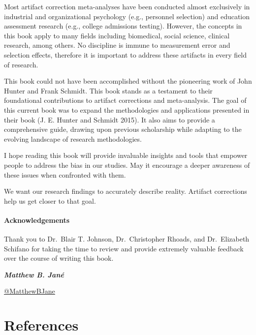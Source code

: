 \documentclass[
  letterpaper,
  DIV=11,
  numbers=noendperiod]{scrreprt}
\begin{document}
Most artifact correction meta-analyses have been conducted almost
exclusively in industrial and organizational psychology (e.g., personnel
selection) and education assessment research (e.g., college admissions
testing). However, the concepts in this book apply to many fields
including biomedical, social science, clinical research, among others.
No discipline is immune to measurement error and selection effects,
therefore it is important to address these artifacts in every field of
research.

This book could not have been accomplished without the pioneering work
of John Hunter and Frank Schmidt. This book stands as a testament to
their foundational contributions to artifact corrections and
meta-analysis. The goal of this current book was to expand the
methodologies and applications presented in their book (J. E. Hunter and
Schmidt 2015). It also aims to provide a comprehensive guide, drawing
upon previous scholarship while adapting to the evolving landscape of
research methodologies.

I hope reading this book will provide invaluable insights and tools that
empower people to address the bias in our studies. May it encourage a
deeper awareness of these issues when confronted with them.

We want our research findings to accurately describe reality. Artifact
corrections help us get closer to that goal.

\subsubsection*{Acknowledgements}\label{acknowledgements}

Thank you to Dr.~Blair T. Johnson, Dr.~Christopher Rhoads, and
Dr.~Elizabeth Schifano for taking the time to review and provide
extremely valuable feedback over the course of writing this book.

\textbf{\emph{Matthew B. Jané}}

\href{https://x.com/MatthewBJane}{ @MatthewBJane}


\chapter*{References}\label{references}

\end{document}
